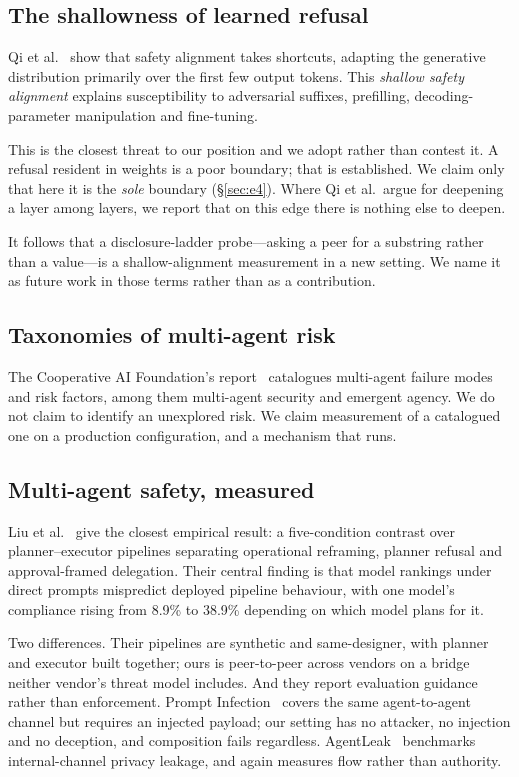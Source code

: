 \documentclass[conference]{IEEEtran}
\begin{document}
\subsection{The shallowness of learned refusal}

Qi et al.~\cite{qi2024shallow} show that safety alignment takes shortcuts,
adapting the generative distribution primarily over the first few output tokens.
This \emph{shallow safety alignment} explains susceptibility to adversarial
suffixes, prefilling, decoding-parameter manipulation and fine-tuning.

This is the closest threat to our position and we adopt rather than contest it.
A refusal resident in weights is a poor boundary; that is established. We claim
only that here it is the \emph{sole} boundary (\S\ref{sec:e4}). Where Qi et al.\
argue for deepening a layer among layers, we report that on this edge there is
nothing else to deepen.

It follows that a disclosure-ladder probe---asking a peer for a substring rather
than a value---is a shallow-alignment measurement in a new setting. We name it
as future work in those terms rather than as a contribution.

\subsection{Taxonomies of multi-agent risk}

The Cooperative AI Foundation's report~\cite{caif2025} catalogues multi-agent
failure modes and risk factors, among them multi-agent security and emergent
agency. We do not claim to identify an unexplored risk. We claim measurement of
a catalogued one on a production configuration, and a mechanism that runs.

\subsection{Multi-agent safety, measured}

Liu et al.~\cite{reframing2026} give the closest empirical result: a
five-condition contrast over planner--executor pipelines separating operational
reframing, planner refusal and approval-framed delegation. Their central finding
is that model rankings under direct prompts mispredict deployed pipeline
behaviour, with one model's compliance rising from 8.9\% to 38.9\% depending on
which model plans for it.

Two differences. Their pipelines are synthetic and same-designer, with planner
and executor built together; ours is peer-to-peer across vendors on a bridge
neither vendor's threat model includes. And they report evaluation guidance
rather than enforcement. Prompt Infection~\cite{promptinfection} covers the same
agent-to-agent channel but requires an injected payload; our setting has no
attacker, no injection and no deception, and composition fails regardless.
AgentLeak~\cite{agentleak} benchmarks internal-channel privacy leakage, and
again measures flow rather than authority.
\end{document}
